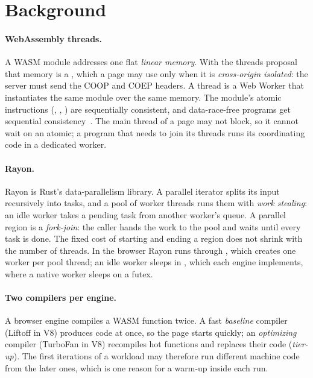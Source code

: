 \section{Background}
\label{sec:background}

\paragraph{WebAssembly threads.} A WASM module addresses one flat
\emph{linear memory}. With the threads proposal that memory is a
, which a page may use only when it is
\emph{cross-origin isolated}: the server must send the COOP and COEP headers.
A thread is a Web Worker that instantiates the same module over the same
memory. The module's atomic instructions (,
, ) are sequentially
consistent, and data-race-free programs get sequential
consistency~\cite{watt2019}. The main thread of a page may not block, so it
cannot wait on an atomic; a program that needs to join its threads runs its
coordinating code in a dedicated worker.

\paragraph{Rayon.} Rayon is Rust's data-parallelism library. A parallel
iterator splits its input recursively into tasks, and a pool of worker
threads runs them with \emph{work stealing}: an idle worker takes a pending
task from another worker's queue. A parallel region is a \emph{fork-join}:
the caller hands the work to the pool and waits until every task is done.
The fixed cost of starting and ending a region does not shrink with the
number of threads. In the browser Rayon runs through
, which creates one worker per pool thread; an idle
worker sleeps in , which each engine implements,
where a native worker sleeps on a futex.

\paragraph{Two compilers per engine.} A browser engine compiles a WASM
function twice. A fast \emph{baseline} compiler (Liftoff in V8) produces
code at once, so the page starts quickly; an \emph{optimizing} compiler
(TurboFan in V8) recompiles hot functions and replaces their code
(\emph{tier-up}). The first iterations of a workload may therefore run
different machine code from the later ones, which is one reason for a
warm-up inside each run.

